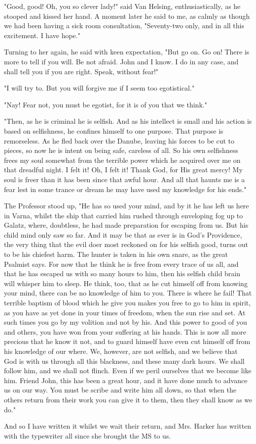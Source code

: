 "Good, good! Oh, you so clever lady!" said Van Helsing, enthusiastically, as he stooped and kissed her hand. A moment later he said to me, as calmly as though we had been having a sick room consultation, "Seventy-two only, and in all this excitement. I have hope." 

Turning to her again, he said with keen expectation, "But go on. Go on! There is more to tell if you will. Be not afraid. John and I know. I do in any case, and shall tell you if you are right. Speak, without fear!" 

"I will try to. But you will forgive me if I seem too egotistical." 

"Nay! Fear not, you must be egotist, for it is of you that we think." 

"Then, as he is criminal he is selfish. And as his intellect is small and his action is based on selfishness, he confines himself to one purpose. That purpose is remorseless. As he fled back over the Danube, leaving his forces to be cut to pieces, so now he is intent on being safe, careless of all. So his own selfishness frees my soul somewhat from the terrible power which he acquired over me on that dreadful night. I felt it! Oh, I felt it! Thank God, for His great mercy! My soul is freer than it has been since that awful hour. And all that haunts me is a fear lest in some trance or dream he may have used my knowledge for his ends." 

The Professor stood up, "He has so used your mind, and by it he has left us here in Varna, whilst the ship that carried him rushed through enveloping fog up to Galatz, where, doubtless, he had made preparation for escaping from us. But his child mind only saw so far. And it may be that as ever is in God's Providence, the very thing that the evil doer most reckoned on for his selfish good, turns out to be his chiefest harm. The hunter is taken in his own snare, as the great Psalmist says. For now that he think he is free from every trace of us all, and that he has escaped us with so many hours to him, then his selfish child brain will whisper him to sleep. He think, too, that as he cut himself off from knowing your mind, there can be no knowledge of him to you. There is where he fail! That terrible baptism of blood which he give you makes you free to go to him in spirit, as you have as yet done in your times of freedom, when the sun rise and set. At such times you go by my volition and not by his. And this power to good of you and others, you have won from your suffering at his hands. This is now all more precious that he know it not, and to guard himself have even cut himself off from his knowledge of our where. We, however, are not selfish, and we believe that God is with us through all this blackness, and these many dark hours. We shall follow him, and we shall not flinch. Even if we peril ourselves that we become like him. Friend John, this has been a great hour, and it have done much to advance us on our way. You must be scribe and write him all down, so that when the others return from their work you can give it to them, then they shall know as we do." 

And so I have written it whilst we wait their return, and Mrs. Harker has written with the typewriter all since she brought the MS to us. 
